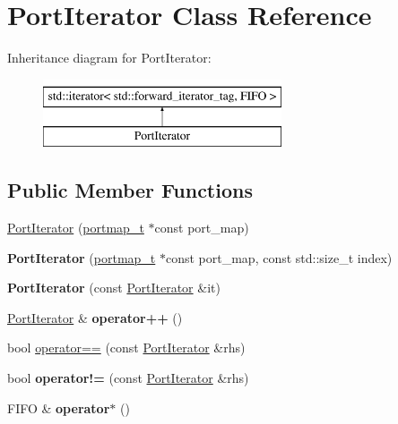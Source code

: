 \hypertarget{class_port_iterator}{}\section{Port\+Iterator Class Reference}
\label{class_port_iterator}
Inheritance diagram for Port\+Iterator\+:\begin{figure}[H]
\begin{center}
\leavevmode
\includegraphics[height=2.000000cm]{class_port_iterator}
\end{center}
\end{figure}
\subsection*{Public Member Functions}
\begin{DoxyCompactItemize}
\item 
\hyperlink{class_port_iterator_a3d68fbe1ad98fbb8c7e25a9aecf8b5bf}{Port\+Iterator} (\hyperlink{structportmap__t}{portmap\+\_\+t} $\ast$const port\+\_\+map)
\item 
\hypertarget{class_port_iterator_acbaabd514cbbdcb0bb11e6ba381e9d3e}{}{\bfseries Port\+Iterator} (\hyperlink{structportmap__t}{portmap\+\_\+t} $\ast$const port\+\_\+map, const std\+::size\+\_\+t index)\label{class_port_iterator_acbaabd514cbbdcb0bb11e6ba381e9d3e}

\item 
\hypertarget{class_port_iterator_a68e10983b59c3889b73bff2635f2bb88}{}{\bfseries Port\+Iterator} (const \hyperlink{class_port_iterator}{Port\+Iterator} \&it)\label{class_port_iterator_a68e10983b59c3889b73bff2635f2bb88}

\item 
\hypertarget{class_port_iterator_a4695f037ef33e9ba809199401c9cb10f}{}\hyperlink{class_port_iterator}{Port\+Iterator} \& {\bfseries operator++} ()\label{class_port_iterator_a4695f037ef33e9ba809199401c9cb10f}

\item 
bool \hyperlink{class_port_iterator_ad41e4cf00699a49d6e0a30c8af3e7469}{operator==} (const \hyperlink{class_port_iterator}{Port\+Iterator} \&rhs)
\item 
\hypertarget{class_port_iterator_a4e2b7f7908ab1537205337d8d99a8e70}{}bool {\bfseries operator!=} (const \hyperlink{class_port_iterator}{Port\+Iterator} \&rhs)\label{class_port_iterator_a4e2b7f7908ab1537205337d8d99a8e70}

\item 
\hypertarget{class_port_iterator_a2d045feb7d7679a6968446fd78daed9d}{}F\+I\+F\+O \& {\bfseries operator$\ast$} ()\label{class_port_iterator_a2d045feb7d7679a6968446fd78daed9d}

\end{DoxyCompactItemize}


